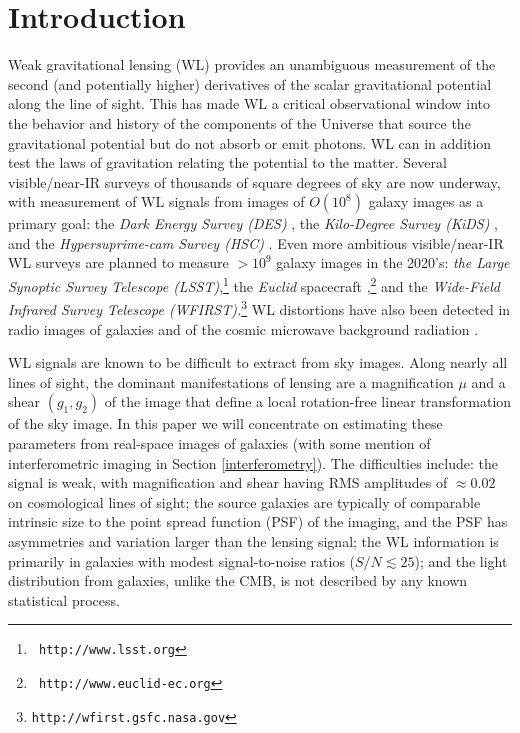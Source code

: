 \documentclass[11pt,preprint,flushrt]{aastex}
\begin{document}
\section{Introduction}
Weak gravitational lensing (WL) provides an unambiguous measurement of the
second (and potentially higher) derivatives of the scalar gravitational potential
along the line of sight.  This has made WL a critical observational
window into the behavior and history of the components of
the Universe that source the gravitational potential but do not absorb or emit photons.
WL can in addition test the laws of gravitation relating the potential
to the matter.  Several visible/near-IR surveys of thousands of square
degrees of sky are now underway, with measurement of WL signals from
images of $O(10^8)$ galaxy images as a
primary goal: the \emph{Dark Energy Survey (DES)} \citep{jarvissv},
the \emph{Kilo-Degree Survey (KiDS)} \citep{kids}, and the
\emph{Hypersuprime-cam Survey (HSC)} \citep{hsc}.  Even
more ambitious 
visible/near-IR WL surveys are planned to measure $>10^9$ galaxy
images in the 2020's: \emph{the Large
  Synoptic Survey Telescope (LSST)},\footnote{{\tt
    http://www.lsst.org}} the \emph{Euclid} spacecraft \citep{Euclidredbook},\footnote{{\tt
    http://www.euclid-ec.org}}  and
the \emph{Wide-Field Infrared Survey Telescope
  (WFIRST).}\footnote{{\tt http://wfirst.gsfc.nasa.gov}}
WL distortions have also been detected in radio images of galaxies
\citep{chang,DB15} and of the cosmic microwave background radiation
\citep{spt,act,planck,descmb}.

WL signals are known to be difficult to extract from sky images.
Along nearly all lines of sight, the dominant manifestations of
lensing are a magnification $\mu$ and a shear $(g_1,g_2)$ of the
image that define a local rotation-free linear transformation of the
sky image.  In this paper we will concentrate on estimating these
parameters from real-space images of galaxies (with some mention of
interferometric imaging in Section \ref{interferometry}).  The
difficulties include: the signal is weak, with
magnification and shear having RMS amplitudes of $\approx0.02$ on
cosmological lines of sight; the source galaxies are typically of
comparable intrinsic size to the point spread function (PSF) of the
imaging, and the PSF has asymmetries and variation larger than the
lensing signal; the WL information is primarily in galaxies with
modest signal-to-noise ratios ($S/N\lesssim25$); and the light distribution from
galaxies, unlike the CMB, is not described by any known
statistical process.
\end{document}
